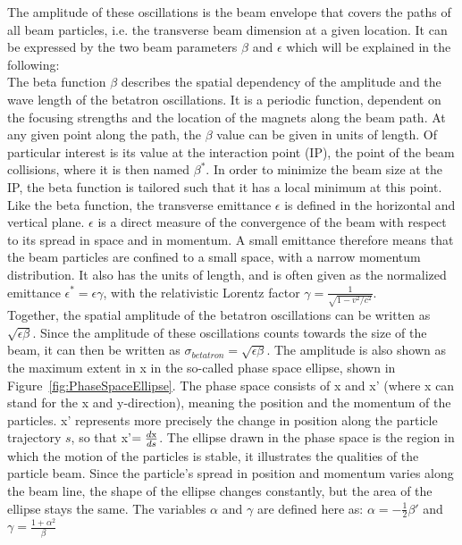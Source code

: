 The amplitude of these oscillations is the beam envelope that covers the paths of all beam particles, i.e. the transverse beam dimension at a given location.
It can be expressed by the two beam parameters $\beta$ and $\epsilon$ which will be explained in the following:\\
The beta function $\beta$ describes the spatial dependency of the amplitude and the wave length of the betatron oscillations.
It is a periodic function, dependent on the focusing strengths and the location of the magnets along the beam path.
At any given point along the path, the $\beta$ value can be given in units of length.
Of particular interest is its value at the interaction point (IP), the point of the beam collisions, where it is then named $\beta^*$.
In order to minimize the beam size at the IP, the beta function is tailored such that it has a local minimum at this point.  
\\
Like the beta function, the transverse emittance $\epsilon$ is defined in the horizontal and vertical plane.
$\epsilon$ is a direct measure of the convergence of the beam with respect to its spread in space and in momentum.
A small emittance therefore means that the beam particles are confined to a small space, with a narrow momentum distribution.
It also has the units of length, and is often given as the normalized emittance $\epsilon^* = \epsilon\gamma$, with the relativistic Lorentz factor $\gamma=\frac{1}{\sqrt{1-v^2/c^2}}$.\\
Together, the spatial amplitude of the betatron oscillations can be written as $\sqrt{\epsilon\beta}$.
Since the amplitude of these oscillations counts towards the size of the beam, it can then be written as $\sigma_{betatron} = \sqrt{\epsilon\beta}$.
The amplitude is also shown as the maximum extent in x in the so-called phase space ellipse, shown in Figure~\ref{fig:PhaseSpaceEllipse}.
The phase space consists of x and x' (where x can stand for the x and y-direction), meaning the position and the momentum of the particles.
x' represents more precisely the change in position along the particle trajectory $s$, so that x'$=\frac{d\rm{x}}{ds}$.
The ellipse drawn in the phase space is the region in which the motion of the particles is stable, it illustrates the qualities of the particle beam.
Since the particle's spread in position and momentum varies along the beam line, the shape of the ellipse changes constantly, but the area of the ellipse stays the same.
The variables $\alpha$ and $\gamma$ are defined here as: $\alpha = -\frac12\beta'$ and $\gamma = \frac{1+\alpha^2}{\beta}$~\cite[cf. p. 283ff]{Wangler}
